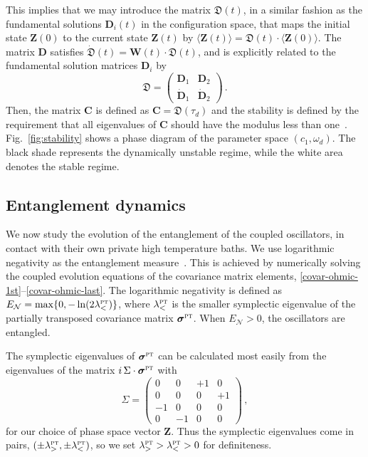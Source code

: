 \documentclass[11pt,a4paper]{article}
\begin{document}
This implies that we may introduce the matrix $\bm{\mathfrak{D}}(t)$, in a similar fashion as the fundamental solutions $\bm{D}_{i}(t)$ in the configuration space, that maps the initial state $\bm{Z}(0)$ to the current state $\bm{Z}(t)$ by $\langle\bm{Z}(t)\rangle=\bm{\mathfrak{D}}(t)\cdot\langle\bm{Z}(0)\rangle$. The matrix $\bm{D}$ satisfies $\dot{\bm{\mathfrak{D}}}(t)=\bm{W}(t)\cdot\bm{\mathfrak{D}}(t)$, and is explicitly related to the fundamental solution matrices $\bm{D}_{i}$ by
\begin{equation}
	\bm{\mathfrak{D}} = \begin{pmatrix} \bm{D}_1 &\bm{D}_2 \\ \dot{\bm{D}}_1  &\dot{\bm{D}}_2      \end{pmatrix}\,.
\end{equation}
Then, the matrix $\bm{C}$ is defined as $\bm{C} = \bm{\mathfrak{D}}(\tau_d)$ and the stability is defined by the requirement that all eigenvalues of $\bm{C}$ should have the modulus less than one~\cite{mathieu-stbl,mathieu-stbl2}. Fig.~\ref{fig:stability} shows a phase diagram of the parameter space $(c_{1},\omega_{d})$. The black shade represents the dynamically unstable regime, while the white area denotes the stable regime.





\subsection{Entanglement dynamics}\label{entng-ohmic}

We now study the evolution of the entanglement of the coupled oscillators, in contact with their own private high temperature baths. We use logarithmic negativity as the entanglement measure~\cite{part-tr,Plenio}. This is achieved by numerically solving the coupled evolution equations of the covariance matrix elements, \eqref{covar-ohmic-1st}--\eqref{covar-ohmic-last}. 
The logarithmic negativity is defined as $E_{\mathcal{N}} = \max\{0,-\ln(2\lambda_{<}^{\textsc{pt}})\}$, where $\lambda_{<}^{\textsc{pt}}$ is the smaller symplectic eigenvalue of the partially transposed covariance matrix $\bm{\sigma}^{\textsc{pt}}$. When $E_{\mathcal{N}}>0$, the oscillators are entangled. 


The symplectic eigenvalues of $\bm{\sigma}^{\textsc{pt}}$ can be calculated most easily from the eigenvalues of the matrix $i\,\Sigma\cdot\bm{\sigma}^{\textsc{pt}}$ with 
\begin{equation}
	\Sigma = \begin{pmatrix} 0 &0 &+1 &0\\ 0 &0 &0 &+1 \\ -1 &0 &0 &0\\ 0 &-1 &0 &0 \end{pmatrix}\,,
\end{equation}
for our choice of phase space vector $\bm{Z}$. Thus the symplectic eigenvalues come in pairs, $(\pm\lambda_{>}^{\textsc{pt}},\pm\lambda_{<}^{\textsc{pt}})$, so  we set $\lambda_{>}^{\textsc{pt}} > \lambda_{<}^{\textsc{pt}} > 0$ for definiteness.
\end{document}
